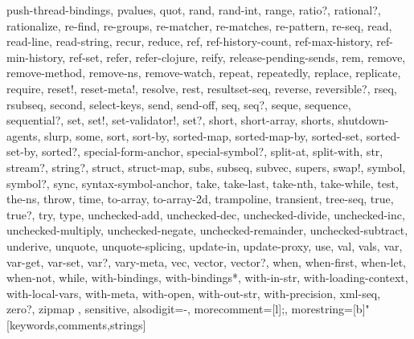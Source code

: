 {{    push-thread-bindings,
    pvalues,
    quot,
    rand,
    rand-int,
    range,
    ratio?,
    rational?,
    rationalize,
    re-find,
    re-groups,
    re-matcher,
    re-matches,
    re-pattern,
    re-seq,
    read,
    read-line,
    read-string,
    recur,
    reduce,
    ref,
    ref-history-count,
    ref-max-history,
    ref-min-history,
    ref-set,
    refer,
    refer-clojure,
    reify,
    release-pending-sends,
    rem,
    remove,
    remove-method,
    remove-ns,
    remove-watch,
    repeat,
    repeatedly,
    replace,
    replicate,
    require,
    reset!,
    reset-meta!,
    resolve,
    rest,
    resultset-seq,
    reverse,
    reversible?,
    rseq,
    rsubseq,
    second,
    select-keys,
    send,
    send-off,
    seq,
    seq?,
    seque,
    sequence,
    sequential?,
    set,
    set!,
    set-validator!,
    set?,
    short,
    short-array,
    shorts,
    shutdown-agents,
    slurp,
    some,
    sort,
    sort-by,
    sorted-map,
    sorted-map-by,
    sorted-set,
    sorted-set-by,
    sorted?,
    special-form-anchor,
    special-symbol?,
    split-at,
    split-with,
    str,
    stream?,
    string?,
    struct,
    struct-map,
    subs,
    subseq,
    subvec,
    supers,
    swap!,
    symbol,
    symbol?,
    sync,
    syntax-symbol-anchor,
    take,
    take-last,
    take-nth,
    take-while,
    test,
    the-ns,
    throw,
    time,
    to-array,
    to-array-2d,
    trampoline,
    transient,
    tree-seq,
    true,
    true?,
    try,
    type,
    unchecked-add,
    unchecked-dec,
    unchecked-divide,
    unchecked-inc,
    unchecked-multiply,
    unchecked-negate,
    unchecked-remainder,
    unchecked-subtract,
    underive,
    unquote,
    unquote-splicing,
    update-in,
    update-proxy,
    use,
    val,
    vals,
    var,
    var-get,
    var-set,
    var?,
    vary-meta,
    vec,
    vector,
    vector?,
    when,
    when-first,
    when-let,
    when-not,
    while,
    with-bindings,
    with-bindings*,
    with-in-str,
    with-loading-context,
    with-local-vars,
    with-meta,
    with-open,
    with-out-str,
    with-precision,
    xml-seq,
    zero?,
    zipmap
  },
  sensitive,
  alsodigit=-,
  morecomment=[l];,
  morestring=[b]"
}[keywords,comments,strings]


\usepackage{amsmath}

%
%
\usepackage{amssymb}

